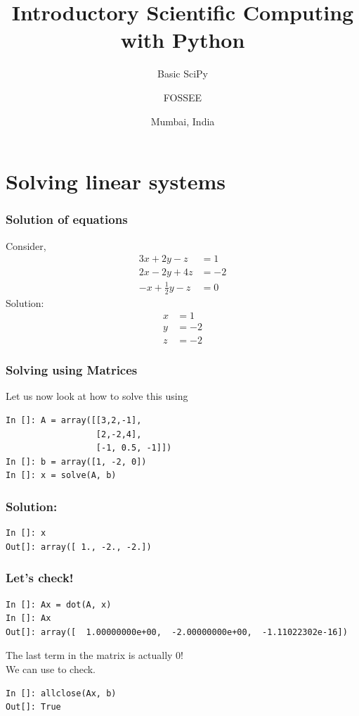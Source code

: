 \documentclass[14pt,compress]{beamer}
\title[Basic SciPy]{Introductory Scientific Computing with
Python}
\subtitle{Basic SciPy}
\author[Prabhu] {FOSSEE}
\institute[FOSSEE -- IITB] {Department of Aerospace Engineering\\IIT Bombay}
\date[] {
Mumbai, India
}
\newcounter{time}
\newcommand{\inctime}[1]{\addtocounter{time}{#1}{\tiny \thetime\ m}}
\newcommand{\kwrd}[1]{ \texttt{\textbf{\color{blue}{#1}}}  }
\begin{document}
\begin{frame}
  \maketitle
\end{frame}


\section{Solving linear systems}

\begin{frame}[fragile]
\frametitle{Solution of equations}
Consider,
  \begin{align*}
    3x + 2y - z  & = 1 \\
    2x - 2y + 4z  & = -2 \\
    -x + \frac{1}{2}y -z & = 0
  \end{align*}
Solution:
  \begin{align*}
    x & = 1 \\
    y & = -2 \\
    z & = -2
  \end{align*}
\end{frame}

\begin{frame}[fragile]
\frametitle{Solving using Matrices}
Let us now look at how to solve this using \kwrd{matrices}
  \begin{lstlisting}
In []: A = array([[3,2,-1],
                  [2,-2,4],
                  [-1, 0.5, -1]])
In []: b = array([1, -2, 0])
In []: x = solve(A, b)
  \end{lstlisting}
\end{frame}

\begin{frame}[fragile]
\frametitle{Solution:}
\begin{lstlisting}
In []: x
Out[]: array([ 1., -2., -2.])
\end{lstlisting}
\end{frame}

\begin{frame}[fragile]
\frametitle{Let's check!}
\begin{small}
\begin{lstlisting}
In []: Ax = dot(A, x)
In []: Ax
Out[]: array([  1.00000000e+00,  -2.00000000e+00,  -1.11022302e-16])
\end{lstlisting}
\end{small}
\begin{block}{}
The last term in the matrix is actually \alert{0}!\\
We can use \kwrd{allclose()} to check.
\end{block}
\begin{lstlisting}
In []: allclose(Ax, b)
Out[]: True
\end{lstlisting}
\inctime{10}
\end{frame}
\end{document}
